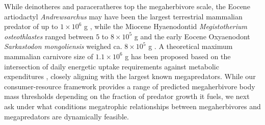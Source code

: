 \documentclass[]{rsos}%
\begin{document}

While deinotheres and paraceratheres top the megaherbivore scale, the Eocene artiodactyl \emph{Andrewsarchus} may have been the largest terrestrial mammalian predator of up to $1\times10^6$ g \cite{burness2001dinosaurs}, while the Miocene Hyaenodontid \emph{Megistotherium osteothlastes} ranged between $5$ to $8\times10^5$ g and the early Eocene Oxyaenodont \emph{Sarkastodon mongoliensis} weighed ca. $8\times10^5$ g \cite{sorkin2008biomechanical} . %
A theoretical maximum mammalian carnivore size of $1.1\times10^6$ g has been proposed based on the intersection of daily energetic uptake requirements against metabolic expenditures \cite{Carbone:2007dz}, closely aligning with the largest known megapredators.
While our consumer-resource framework provides a range of predicted megaherbivore body mass thresholds depending on the fraction of predator growth it fuels, we next ask under what conditions megatrophic relationships between megaherbivores and megapredators are dynamically feasible.
\end{document}
